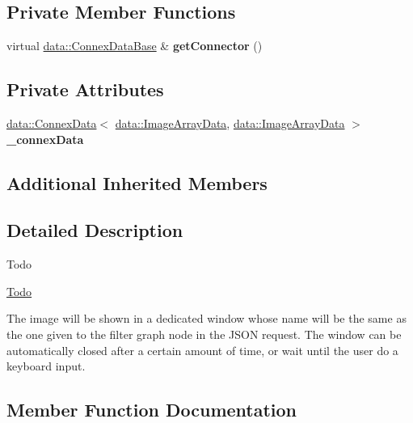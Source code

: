\subsection*{Private Member Functions}
\begin{DoxyCompactItemize}
\item 
\mbox{\label{classfilter_1_1algos_1_1_show_image_a3396c638322a2eeb5854567397065f04}} 
virtual \hyperlink{classfilter_1_1data_1_1_connex_data_base}{data\+::\+Connex\+Data\+Base} \& {\bfseries get\+Connector} ()
\end{DoxyCompactItemize}
\subsection*{Private Attributes}
\begin{DoxyCompactItemize}
\item 
\mbox{\label{classfilter_1_1algos_1_1_show_image_acbd73128815a37f15330a3e4ce604a42}} 
\hyperlink{classfilter_1_1data_1_1_connex_data}{data\+::\+Connex\+Data}$<$ \hyperlink{classfilter_1_1data_1_1_image_array_data}{data\+::\+Image\+Array\+Data}, \hyperlink{classfilter_1_1data_1_1_image_array_data}{data\+::\+Image\+Array\+Data} $>$ {\bfseries \+\_\+connex\+Data}
\end{DoxyCompactItemize}
\subsection*{Additional Inherited Members}


\subsection{Detailed Description}
\begin{DoxyRefDesc}{Todo}
\item[\hyperlink{todo__todo000014}{Todo}]\end{DoxyRefDesc}
The image will be shown in a dedicated window whose name will be the same as the one given to the filter graph node in the J\+S\+ON request. The window can be automatically closed after a certain amount of time, or wait until the user do a keyboard input. 

\subsection{Member Function Documentation}
\mbox{\label{classfilter_1_1algos_1_1_show_image_a752acc552a91b93b42acf0a1269b5e73}} 
